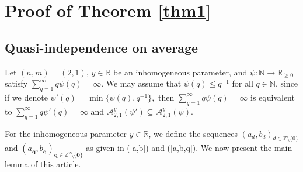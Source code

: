 \documentclass[reqno]{amsart}
\theoremstyle{definition}
\theoremstyle{remark}
\begin{document}
\vspace{.1cm}
\section{Proof of Theorem \ref{thm1}}
\subsection{Quasi-independence on average}
Let $(n,m) = (2,1)$, $y\in \mathbb{R}$ be an inhomogeneous parameter, and $\psi:\mathbb{N} \to \mathbb{R}_{\geq 0}$ satisfy $\sum_{q=1}^\infty q\psi(q) = \infty.$ We may assume that $\psi(q) \leq q^{-1}$ for all $q \in \mathbb{N}$, since if we denote $\psi'(q) = \min\{\psi(q), q^{-1}\},$ then $\sum_{q=1}^\infty q\psi(q) = \infty$ is equivalent to $\sum_{q=1}^\infty q\psi'(q) = \infty$ and $\mathscr{A}^y_{2,1}(\psi') \subseteq \mathscr{A}^y_{2,1}(\psi)$.

For the inhomogeneous parameter $y\in \mathbb{R}$, we define the sequences $(a_d, b_d)_{d \in \mathbb{Z} \setminus\{0\}}$ and $(a_\mathbf{q}, b_\mathbf{q})_{\mathbf{q} \in \mathbb{Z}^2 \setminus \{\mathbf{0}\}}$ as given in (\ref{a,b}) and (\ref{a,b,q}). We now present the main lemma of this article.
\end{document}
